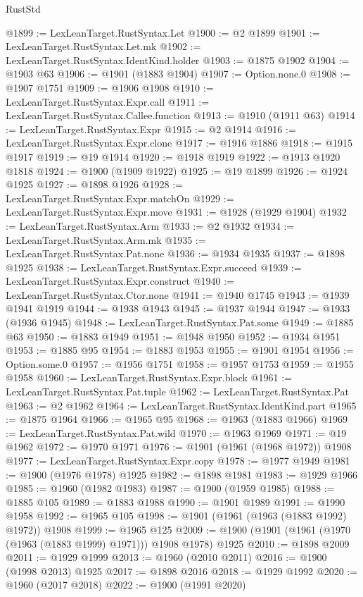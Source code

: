 \begin{lexlean}{RustStd}
\begin{coremodule}
{\begin{coremodule}
{{{{{{{{{{{{{{{{{{{{{{{{{{{{{{{{{{{{{{{{{{{@1899 := LexLeanTarget.RustSyntax.Let
@1900 := @2 @1899
@1901 := LexLeanTarget.RustSyntax.Let.mk
@1902 := LexLeanTarget.RustSyntax.IdentKind.holder
@1903 := @1875 @1902
@1904 := @1903 @63
@1906 := @1901 (@1883 @1904)
@1907 := Option.none.{0}
@1908 := @1907 @1751
@1909 := @1906 @1908
@1910 := LexLeanTarget.RustSyntax.Expr.call
@1911 := LexLeanTarget.RustSyntax.Callee.function
@1913 := @1910 (@1911 @63)
@1914 := LexLeanTarget.RustSyntax.Expr
@1915 := @2 @1914
@1916 := LexLeanTarget.RustSyntax.Expr.clone
@1917 := @1916 @1886
@1918 := @1915 @1917
@1919 := @19 @1914
@1920 := @1918 @1919
@1922 := @1913 @1920 @1818
@1924 := @1900 (@1909 @1922)
@1925 := @19 @1899
@1926 := @1924 @1925
@1927 := @1898 @1926
@1928 := LexLeanTarget.RustSyntax.Expr.matchOn
@1929 := LexLeanTarget.RustSyntax.Expr.move
@1931 := @1928 (@1929 @1904)
@1932 := LexLeanTarget.RustSyntax.Arm
@1933 := @2 @1932
@1934 := LexLeanTarget.RustSyntax.Arm.mk
@1935 := LexLeanTarget.RustSyntax.Pat.none
@1936 := @1934 @1935
@1937 := @1898 @1925
@1938 := LexLeanTarget.RustSyntax.Expr.succeed
@1939 := LexLeanTarget.RustSyntax.Expr.construct
@1940 := LexLeanTarget.RustSyntax.Ctor.none
@1941 := @1940 @1745
@1943 := @1939 @1941 @1919
@1944 := @1938 @1943
@1945 := @1937 @1944
@1947 := @1933 (@1936 @1945)
@1948 := LexLeanTarget.RustSyntax.Pat.some
@1949 := @1885 @63
@1950 := @1883 @1949
@1951 := @1948 @1950
@1952 := @1934 @1951
@1953 := @1885 @95
@1954 := @1883 @1953
@1955 := @1901 @1954
@1956 := Option.some.{0}
@1957 := @1956 @1751
@1958 := @1957 @1753
@1959 := @1955 @1958
@1960 := LexLeanTarget.RustSyntax.Expr.block
@1961 := LexLeanTarget.RustSyntax.Pat.tuple
@1962 := LexLeanTarget.RustSyntax.Pat
@1963 := @2 @1962
@1964 := LexLeanTarget.RustSyntax.IdentKind.part
@1965 := @1875 @1964
@1966 := @1965 @95
@1968 := @1963 (@1883 @1966)
@1969 := LexLeanTarget.RustSyntax.Pat.wild
@1970 := @1963 @1969
@1971 := @19 @1962
@1972 := @1970 @1971
@1976 := @1901 (@1961 (@1968 @1972)) @1908
@1977 := LexLeanTarget.RustSyntax.Expr.copy
@1978 := @1977 @1949
@1981 := @1900 (@1976 @1978) @1925
@1982 := @1898 @1981
@1983 := @1929 @1966
@1985 := @1960 (@1982 @1983)
@1987 := @1900 (@1959 @1985)
@1988 := @1885 @105
@1989 := @1883 @1988
@1990 := @1901 @1989
@1991 := @1990 @1958
@1992 := @1965 @105
@1998 := @1901 (@1961 (@1963 (@1883 @1992) @1972)) @1908
@1999 := @1965 @125
@2009 := @1900 (@1901 (@1961 (@1970 (@1963 (@1883 @1999) @1971))) @1908 @1978) @1925
@2010 := @1898 @2009
@2011 := @1929 @1999
@2013 := @1960 (@2010 @2011)
@2016 := @1900 (@1998 @2013) @1925
@2017 := @1898 @2016
@2018 := @1929 @1992
@2020 := @1960 (@2017 @2018)
@2022 := @1900 (@1991 @2020)
}}}}}}}}}}}}}}}}}}}}}}}}}}}}}}}}}}}}}}}}}}}
\end{coremodule}}
\end{coremodule}
\end{lexlean}
